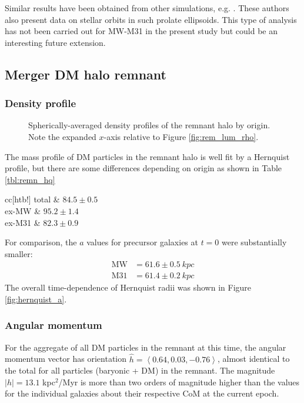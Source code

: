 \documentclass[twocolumn]{aastex63}
\begin{document}
Similar results have been obtained from other simulations, e.g. \citep{wang_orbit_2019}. These authors also present data on stellar orbits in such prolate ellipsoids. This type of analysis has not been carried out for MW-M31 in the present study but could be an interesting future extension.

\subsection{Merger DM halo remnant}

\subsubsection{Density profile}

\begin{figure}[htb!]
	\caption{Spherically-averaged density profiles of the remnant halo by origin. Note the expanded $x$-axis relative to Figure \ref{fig:rem_lum_rho}.
		\label{fig:rem_DM_rho}}
\end{figure}

The mass profile of DM particles in the remnant halo is well fit by a Hernquist profile, but there are some differences depending on origin as shown in Table \ref{tbl:remn_hq}

\begin{deluxetable}{cc}[htb!]
	\tablewidth{0pt}
	\startdata
	total &  $84.5 \pm 0.5$  \\
	ex-MW &   $95.2 \pm 1.4$  \\
	ex-M31 &   $82.3 \pm 0.9$
	\enddata
\end{deluxetable}

For comparison, the $a$ values for precursor galaxies at $t=0$ were substantially smaller:
\begin{align*}
\text{MW} &= 61.6 \pm 0.5\ kpc\\
\text{M31} &= 61.4 \pm 0.2\ kpc
\end{align*}
The overall time-dependence of Hernquist radii was shown in Figure \ref{fig:hernquist_a}.


\subsubsection{Angular momentum}

For the aggregate of all DM particles in the remnant at this time, the angular momentum vector has orientation $\hat{h} = \left< 0.64 ,  0.03, -0.76 \right>$, almost identical to the total for all particles (baryonic + DM) in the remnant. The magnitude $|h| = 13.1$ kpc$^2$/Myr is more than two orders of magnitude higher than the values for the individual galaxies about their respective CoM at the current epoch. 
\end{document}
